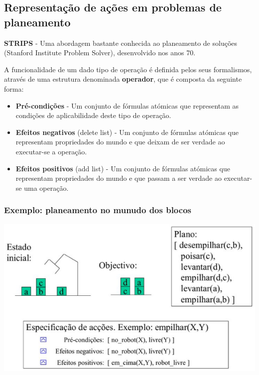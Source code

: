 \documentclass{article}
\begin{document}
\subsection{Representação de ações
em problemas de planeamento}

\begin{flushleft}
  \textbf{STRIPS} - Uma abordagem bastante conhecida ao planeamento de soluções
  (Stanford Institute Problem Solver), desenvolvido nos anos 70.
\end{flushleft}

A funcionalidade de um dado tipo de operação é definida pelos seus formalismos, através de
uma estrutura denominada \textbf{operador}, que é composta da seguinte forma:

\begin{itemize}
  \item \textbf{Pré-condições} - Um conjunto de fórmulas atómicas que representam as
  condições de aplicabilidade deste tipo de operação.

  \item \textbf{Efeitos negativos} (delete list) - Um conjunto de fórmulas atómicas que representam
  propriedades do mundo e que deixam de ser verdade ao executar-se a
  operação.

  \item \textbf{Efeitos positivos} (add list) -  Um conjunto de fórmulas atómicas que representam propriedades do mundo e que
  passam a ser verdade ao executar-se uma operação.
\end{itemize}

\subsubsection{Exemplo: planeamento no munudo dos blocos}

\begin{center}
  \includegraphics[scale=0.4]{57}
\end{center}
\end{document}
